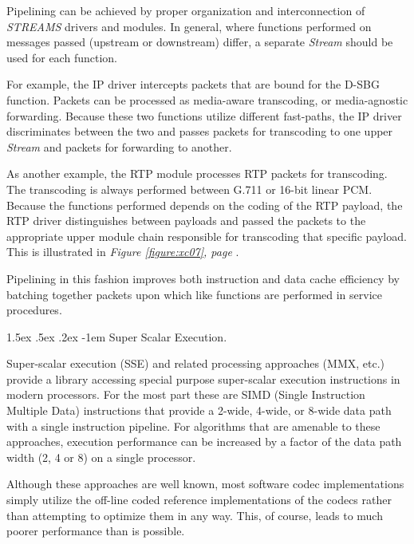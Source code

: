 \documentclass[letterpaper,final,notitlepage,twocolumn,10pt,twoside]{article}
\makeatletter
\let\normalsize = \small
\let\small = \footnotesize
\let\footnotesize = \scriptsize
\let\scriptsize = \tiny
\renewcommand\paragraph{\@startsection{paragraph}{4}{\z@}%
                                    {1.5ex \@plus .5ex \@minus .2ex}%
                                    {-1em}%
                                    {\normalfont\normalsize\bfseries\slshape}}
\makeatother
\begin{document}
Pipelining can be achieved by proper organization and interconnection of
{\sl STREAMS} drivers and modules.  In general, where functions performed on
messages passed (upstream or downstream) differ, a separate {\it Stream}
should be used for each function.

For example, the IP driver intercepts packets that are bound for the D-SBG
function.  Packets can be processed as media-aware transcoding, or
media-agnostic forwarding.  Because these two functions utilize different
fast-paths, the IP driver discriminates between the two and passes packets for
transcoding to one upper {\it Stream} and packets for forwarding to another.

As another example, the RTP module processes RTP packets for transcoding.  The
transcoding is always performed between G.711 or 16-bit linear PCM.  Because
the functions performed depends on the coding of the RTP payload, the RTP
driver distinguishes between payloads and passed the packets to the
appropriate upper module chain responsible for transcoding that specific
payload.  This is illustrated in {\sl Figure \ref{figure:xc07}, page
\pageref{figure:xc07}}.

Pipelining in this fashion improves both instruction and data cache efficiency
by batching together packets upon which like functions are performed in
service procedures.

\paragraph{Super Scalar Execution.}
\label{section:sse}

Super-scalar execution (SSE) and related processing approaches (MMX, etc.)
provide a library accessing special purpose super-scalar execution instructions
in modern processors.  For the most part these are SIMD (Single Instruction
Multiple Data) instructions that provide a 2-wide, 4-wide, or 8-wide data path
with a single instruction pipeline.  For algorithms that are amenable to these
approaches, execution performance can be increased by a factor of the data path
width (2, 4 or 8) on a single processor.

Although these approaches are well known, most software codec implementations
simply utilize the off-line coded reference implementations of the codecs rather
than attempting to optimize them in any way.  This, of course, leads to much
poorer performance than is possible.
\end{document}
